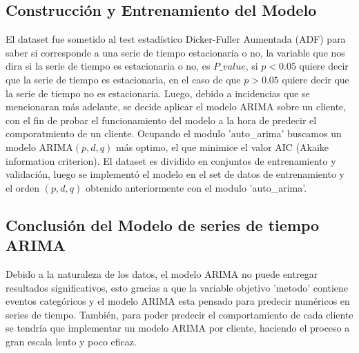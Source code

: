 \subsection{Construcción y Entrenamiento del Modelo}

El dataset fue sometido al test estadístico Dicker-Fuller Aumentada (ADF) para saber si corresponde a una serie de tiempo estacionaria o no, la variable que nos dira si la serie de tiempo es estacionaria o no, es $P\_value$, si $p<0.05$ quiere decir que la serie de tiempo es estacionaria, en el caso de que $p>0.05$ quiere decir que la serie de tiempo no es estacionaria.
Luego, debido a incidencias que se mencionaran más adelante, se decide aplicar el modelo ARIMA sobre un cliente, con el fin de probar el funcionamiento del modelo a la hora de predecir el comporatmiento de un cliente. Ocupando el modulo 'auto\_arima' buscamos un modelo ARIMA$(p,d,q)$ más optimo, el que minimice el valor AIC (Akaike information criterion). 
El dataset es dividido en conjuntos de entrenamiento y validación, luego se implementó el modelo en el set de datos de entrenamiento y el orden $(p,d,q)$ obtenido anteriormente con el modulo 'auto\_arima'.

\subsection{Conclusión del Modelo de series de tiempo ARIMA}

Debido a la naturaleza de los datos, el modelo ARIMA no puede entregar resultados significativos, esto gracias a que la variable objetivo 'metodo' contiene eventos categóricos y el modelo ARIMA esta pensado para predecir numéricos en series de tiempo. También, para poder predecir el comportamiento de cada cliente se tendría que implementar un modelo ARIMA por cliente, haciendo el proceso a gran escala lento y poco eficaz.
